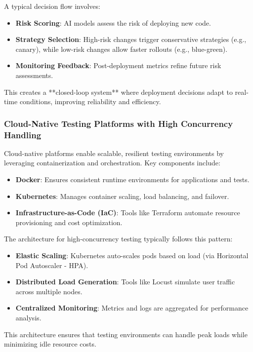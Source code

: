 \documentclass[manuscript,screen,review]{acmart}
\begin{document}
A typical decision flow involves:
\begin{itemize}
    \item \textbf{Risk Scoring}: AI models assess the risk of deploying new code.
    \item \textbf{Strategy Selection}: High-risk changes trigger conservative strategies (e.g., canary), while low-risk changes allow faster rollouts (e.g., blue-green).
    \item \textbf{Monitoring Feedback}: Post-deployment metrics refine future risk assessments.
\end{itemize}

This creates a **closed-loop system** where deployment decisions adapt to real-time conditions, improving reliability and efficiency.


\subsubsection{Cloud-Native Testing Platforms with High Concurrency Handling}

Cloud-native platforms enable scalable, resilient testing environments by leveraging containerization and orchestration. Key components include:
\begin{itemize}
    \item \textbf{Docker}: Ensures consistent runtime environments for applications and tests.
    \item \textbf{Kubernetes}: Manages container scaling, load balancing, and failover.
    \item \textbf{Infrastructure-as-Code (IaC)}: Tools like Terraform automate resource provisioning and cost optimization.
\end{itemize}

The architecture for high-concurrency testing typically follows this pattern:
\begin{itemize}
    \item \textbf{Elastic Scaling}: Kubernetes auto-scales pods based on load (via Horizontal Pod Autoscaler - HPA).
    \item \textbf{Distributed Load Generation}: Tools like Locust simulate user traffic across multiple nodes.
    \item \textbf{Centralized Monitoring}: Metrics and logs are aggregated for performance analysis.
\end{itemize}

This architecture ensures that testing environments can handle peak loads while minimizing idle resource costs.
\end{document}
